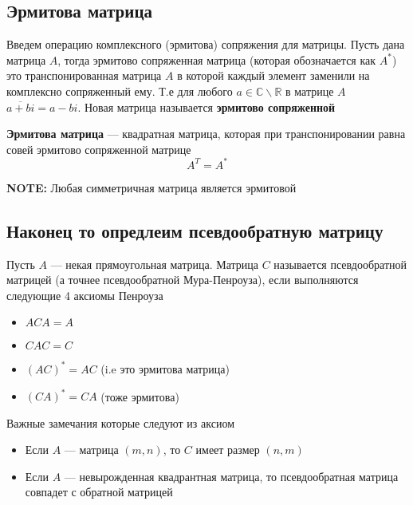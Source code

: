 \documentclass{article}
\begin{document}
    \subsection{Эрмитова матрица}

    Введем операцию комплексного (эрмитова) сопряжения для матрицы.
    Пусть дана матрица $A$, тогда эрмитово сопряженная матрица (которая обозначается как $A^{*}$)
    это транспонированная матрица $A$ в которой каждый элемент заменили на комплексно сопряженный ему.
    Т.е для любого $a \in \mathbb{C} \backslash \mathbb{R}$ в матрице $A$ $\overline{a + b i} = a - bi$.
    Новая матрица называется \textbf{эрмитово сопряженной}

    \quad

    \textbf{Эрмитова матрица} --- квадратная матрица, которая при транспонировании равна совей эрмитово сопряженной матрице
    \begin{equation}
        A^{T} = A^{*}
    \end{equation}

    \quad

    \textbf{NOTE:} Любая симметричная матрица является эрмитовой

    \subsection{Наконец то опредлеим псевдообратную матрицу}

    Пусть $A$ --- некая прямоугольная матрица.
    Матрица $C$ называется псевдообратной матрицей (а точнее псевдообратной Мура-Пенроуза),
    если выполняются следующие 4 аксиомы Пенроуза

    \begin{itemize}
        \item $ACA = A$
        \item $CAC = C$
        \item $(AC)^{*} = AC$ (i.e это эрмитова матрица)
        \item $(CA)^{*} = CA$ (тоже эрмитова)
    \end{itemize}

    \quad

    Важные замечания которые следуют из аксиом

    \begin{itemize}
        \item Если $A$ --- матрица $(m, n)$, то $C$ имеет размер $(n, m)$
        \item Если $A$ --- невырожденная квадрантная матрица, то псевдообратная матрица совпадет с обратной матрицей
    \end{itemize}
\end{document}
